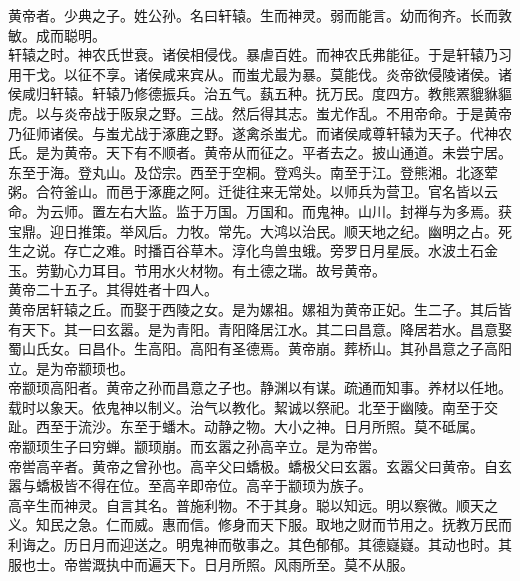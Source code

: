 \documentclass{zhvt-classic}
\begin{document}





\hspace*{2em}黄帝者。少典之子。姓公孙。名曰轩辕。生而神灵。弱而能言。幼而徇齐。长而敦敏。成而聪明。\\
\hspace*{2em}轩辕之时。神农氏世衰。诸侯相侵伐。暴虐百姓。而神农氏弗能征。于是轩辕乃习用干戈。以征不享。诸侯咸来宾从。而蚩尤最为暴。莫能伐。炎帝欲侵陵诸侯。诸侯咸归轩辕。轩辕乃修德振兵。治五气。蓺五种。抚万民。度四方。教熊罴貔貅貙虎。以与炎帝战于阪泉之野。三战。然后得其志。蚩尤作乱。不用帝命。于是黄帝乃征师诸侯。与蚩尤战于涿鹿之野。遂禽杀蚩尤。而诸侯咸尊轩辕为天子。代神农氏。是为黄帝。天下有不顺者。黄帝从而征之。平者去之。披山通道。未尝宁居。\\
\hspace*{2em}东至于海。登丸山。及岱宗。西至于空桐。登鸡头。南至于江。登熊湘。北逐荤粥。合符釜山。而邑于涿鹿之阿。迁徙往来无常处。以师兵为营卫。官名皆以云命。为云师。置左右大监。监于万国。万国和。而鬼神。山川。封禅与为多焉。获宝鼎。迎日推策。举风后。力牧。常先。大鸿以治民。顺天地之纪。幽明之占。死生之说。存亡之难。时播百谷草木。淳化鸟兽虫蛾。旁罗日月星辰。水波土石金玉。劳勤心力耳目。节用水火材物。有土德之瑞。故号黄帝。\\
\hspace*{2em}黄帝二十五子。其得姓者十四人。\\
\hspace*{2em}黄帝居轩辕之丘。而娶于西陵之女。是为嫘祖。嫘祖为黄帝正妃。生二子。其后皆有天下。其一曰玄嚣。是为青阳。青阳降居江水。其二曰昌意。降居若水。昌意娶蜀山氏女。曰昌仆。生高阳。高阳有圣德焉。黄帝崩。葬桥山。其孙昌意之子高阳立。是为帝颛顼也。\\
\hspace*{2em}帝颛顼高阳者。黄帝之孙而昌意之子也。静渊以有谋。疏通而知事。养材以任地。载时以象天。依鬼神以制义。治气以教化。絜诚以祭祀。北至于幽陵。南至于交趾。西至于流沙。东至于蟠木。动静之物。大小之神。日月所照。莫不砥属。\\
\hspace*{2em}帝颛顼生子曰穷蝉。颛顼崩。而玄嚣之孙高辛立。是为帝喾。\\
\hspace*{2em}帝喾高辛者。黄帝之曾孙也。高辛父曰蟜极。蟜极父曰玄嚣。玄嚣父曰黄帝。自玄嚣与蟜极皆不得在位。至高辛即帝位。高辛于颛顼为族子。\\
\hspace*{2em}高辛生而神灵。自言其名。普施利物。不于其身。聪以知远。明以察微。顺天之义。知民之急。仁而威。惠而信。修身而天下服。取地之财而节用之。抚教万民而利诲之。历日月而迎送之。明鬼神而敬事之。其色郁郁。其德嶷嶷。其动也时。其服也士。帝喾溉执中而遍天下。日月所照。风雨所至。莫不从服。\\
\end{document}
